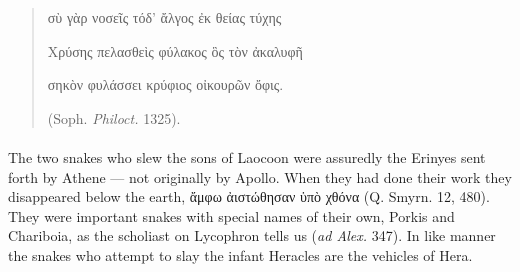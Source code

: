 \documentclass[a4paper, 11pt, oneside, polutonikogreek, english]{article}
\begin{document}
\begin{quotation}
σὺ γὰρ νοσεῖς τόδ' ἄλγος ἐκ θείας τύχης

Χρύσης πελασθεὶς φύλακος ὃς τὸν ἀκαλυφῆ

σηκὸν φυλάσσει κρύφιος οἰκουρῶν ὄφις.

(Soph. \emph{Philoct.} 1325).
\end{quotation}
\paragraph{}
The two snakes who slew the sons of Laocoon were assuredly the Erinyes sent forth by Athene --- not originally by Apollo. When they had done their work they disappeared below the earth, ἄμφω ἀιστώθησαν ὑπὸ χθόνα (Q. Smyrn. 12, 480). They were important snakes with special names of their own, Porkis and Chariboia, as the scholiast on Lycophron tells us (\emph{ad Alex.} 347). In like manner the snakes who attempt to slay the infant Heracles are the vehicles of Hera.
\end{document}
